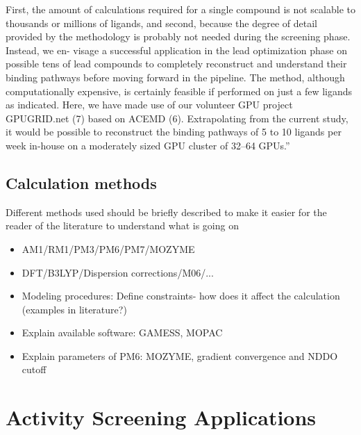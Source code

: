 \begin{itemize}
{First, the amount of calculations required for a single compound is not scalable to thousands or millions of ligands, and second, because the degree of detail provided by the methodology is probably not needed during the screening phase.
Instead, we en- visage a successful application in the lead optimization phase on possible tens of lead compounds to completely reconstruct and understand their binding pathways before moving forward in the pipeline.
The method, although computationally expensive, is certainly feasible if performed on just a few ligands as indicated.
Here, we have made use of our volunteer GPU project GPUGRID.net (7) based on ACEMD (6).
Extrapolating from the current study, it would be possible to reconstruct the binding pathways of 5 to 10 ligands per week in-house on a moderately sized GPU cluster of 32–64 GPUs.}''\cite{buch2011complete}
\end{itemize}

\subsection{Calculation methods}
Different methods used should be briefly described to make it easier for the reader of the literature to understand what is going on
\begin{itemize}
\item AM1/RM1/PM3/PM6/PM7/MOZYME
\item DFT/B3LYP/Dispersion corrections/M06/...
\item Modeling procedures: Define constraints- how does it affect the calculation (examples in literature?)
\item Explain available software: GAMESS, MOPAC
\item Explain parameters of PM6: MOZYME, gradient convergence and NDDO cutoff
\end{itemize}


\section{Activity Screening Applications}\label{sec:apps}

